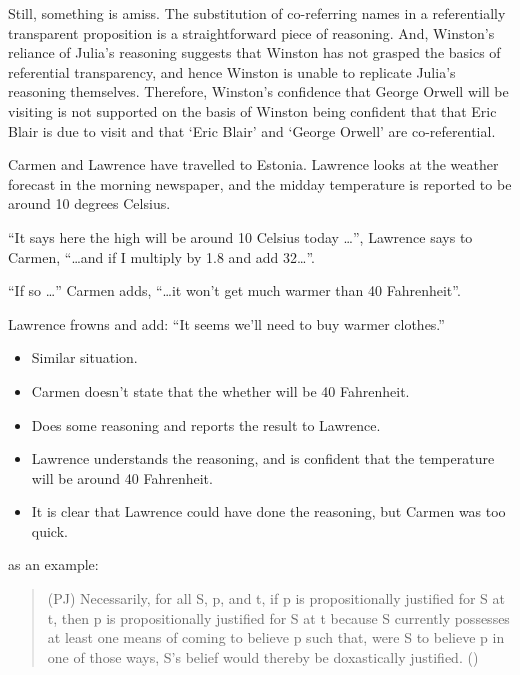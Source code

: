 \documentclass[10pt]{article}
\begin{document}
Still, something is amiss.
The substitution of co-referring names in a referentially transparent proposition is a straightforward piece of reasoning.
And, Winston's reliance of Julia's reasoning suggests that Winston has not grasped the basics of referential transparency, and hence Winston is unable to replicate Julia's reasoning themselves.
Therefore, Winston's confidence that George Orwell will be visiting is not supported on the basis of Winston being confident that that Eric Blair is due to visit and that `Eric Blair' and `George Orwell' are co-referential.

\begin{scenario}
  Carmen and Lawrence have travelled to Estonia.
  Lawrence looks at the weather forecast in the morning newspaper, and the midday temperature is reported to be around 10 degrees Celsius.

  ``It says here the high will be around 10 Celsius today \dots'', Lawrence says to Carmen, ``\dots and if I multiply by 1.8 and add 32\dots''.

  ``If so \dots'' Carmen adds, ``\dots it won't get much warmer than 40 Fahrenheit''.

  Lawrence frowns and add: ``It seems we'll need to buy warmer clothes.''
\end{scenario}

\begin{itemize}
\item Similar situation.
\item Carmen doesn't state that the whether will be 40 Fahrenheit.
\item Does some reasoning and reports the result to Lawrence.
\item Lawrence understands the reasoning, and is confident that the temperature will be around 40 Fahrenheit.
\item It is clear that Lawrence could have done the reasoning, but Carmen was too quick.
\end{itemize}

\textcite{Turri:2010aa} as an example:

\begin{quote}
  (PJ) Necessarily, for all S, p, and t, if p is propositionally justified for S at t, then p is propositionally justified for S at t because S currently possesses at least one means of coming to believe p such that, were S to believe p in one of those ways, S's belief would thereby be doxastically justified.\nolinebreak
  \mbox{}\hfill\mbox{(\citeyear[320]{Turri:2010aa})}
\end{quote}
\end{document}
